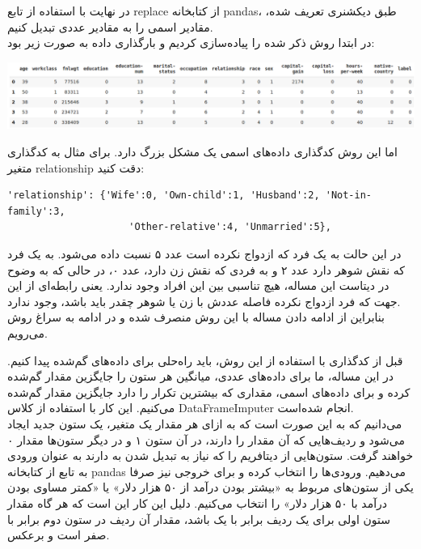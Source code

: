 \documentclass{article}
\begin{document}
در نهایت با استفاده از تابع replace از کتابخانه pandas، طبق دیکشنری تعریف شده، مقادیر اسمی را به مقادیر عددی تبدیل کنیم. \\

در ابتدا روش ذکر شده را پیاده‌سازی کردیم و بارگذاری داده به صورت زیر بود:

\begin{center}
	\includegraphics[scale=0.35]{df_numeric.png} 
\end{center}    

اما این روش کدگذاری داده‌های اسمی یک مشکل بزرگ دارد. برای مثال به کدگذاری متغیر relationship دقت کنید:


\begin{latin}
\begin{lstlisting}
'relationship': {'Wife':0, 'Own-child':1, 'Husband':2, 'Not-in-family':3,
                     'Other-relative':4, 'Unmarried':5},
\end{lstlisting}
\end{latin}

در این حالت به یک فرد که ازدواج نکرده‌ است عدد ۵ نسبت داده می‌شود. به یک فرد که نقش شوهر دارد عدد ۲ و به فردی که نقش زن دارد، عدد ۰، در حالی که به وضوح در دیتاست این مساله، هیچ تناسبی بین این افراد وجود ندارد. یعنی رابطه‌ای از این جهت که فرد ازدواج نکرده فاصله‌ عددش با زن یا شوهر چقدر باید باشد، وجود ندارد. \\

بنابراین از ادامه دادن مساله با این روش منصرف شده و در ادامه به سراغ روش  می‌رویم.

قبل از کدگذاری با استفاده از این روش، باید راه‌حلی برای داده‌های گم‌شده پیدا کنیم. در این مساله، ما برای داده‌های عددی، میانگین هر ستون را جایگزین مقدار گم‌شده کرده و برای داده‌های اسمی، مقداری که بیشترین تکرار را دارد جایگزین مقدار گم‌شده می‌کنیم. این کار با استفاده از کلاس DataFrameImputer انجام شده‌است. \\

می‌دانیم که  به این صورت است که به ازای هر مقدار یک متغیر، یک ستون جدید ایجاد می‌شود و ردیف‌هایی که آن مقدار را دارند، در آن ستون ۱ و در دیگر ستون‌ها مقدار ۰ خواهند گرفت. ستون‌هایی از دیتافریم را که نیاز به تبدیل شدن به  دارند به عنوان ورودی به تابع  از کتابخانه pandas می‌دهیم. ورودی‌ها را انتخاب کرده و برای خروجی نیز صرفا یکی از ستون‌های مربوط به «بیشتر بودن درآمد از ۵۰ هزار دلار» یا «کمتر مساوی بودن درآمد با ۵۰ هزار دلار» را انتخاب می‌کنیم. دلیل این کار این است که هر گاه مقدار ستون اولی برای یک ردیف برابر با یک باشد، مقدار آن ردیف در ستون دوم برابر با صفر است و برعکس. \\
\end{document}
